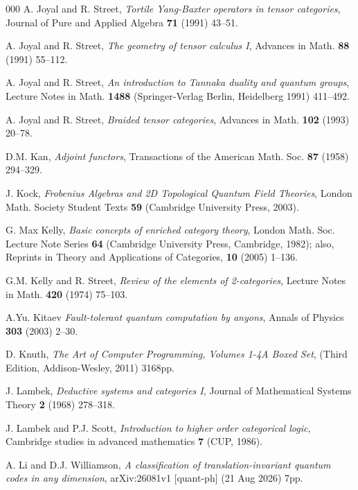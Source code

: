 \documentclass[a4paper,12pt]{article}
\theoremstyle{step}
\begin{document}
\begin{thebibliography}{000}
 A. Joyal and R. Street, 
\textit{Tortile Yang-Baxter operators in tensor categories}, 
Journal of Pure and Applied Algebra \textbf{71} (1991) 43--51. 

 A. Joyal and R. Street, 
\textit{The geometry of tensor calculus I}, 
Advances in Math. \textbf{88} (1991) 55--112.

 A. Joyal and R. Street, 
\textit{An introduction to Tannaka duality and quantum groups}, Lecture Notes in Math. \textbf{1488} (Springer-Verlag Berlin, Heidelberg 1991) 411--492.

  A. Joyal and R. Street, 
\textit{Braided tensor categories}, 
Advances in Math. \textbf{102} (1993) 20--78.

 D.M. Kan, \textit{Adjoint functors}, 
Transactions of the American Math. Soc. \textbf{87} (1958) 294--329. \label{Kan1958}

 J. Kock,
\textit{Frobenius Algebras and 2D Topological Quantum Field Theories},
London Math. Society Student Texts \textbf{59} (Cambridge University Press, 2003).

 G. Max Kelly, 
\textit{Basic concepts of enriched category theory}, 
London Math. Soc. Lecture Note Series \textbf{64} (Cambridge University Press, Cambridge, 1982); also, Reprints in Theory and Applications of Categories, \textbf{10} (2005) 1--136. 

 G.M. Kelly and R. Street, 
\textit{Review of the elements of 2-categories}, 
Lecture Notes in Math. \textbf{420} (1974) 75--103.

 A.Yu. Kitaev
\textit{Fault-tolerant quantum computation by anyons},
Annals of Physics \textbf{303} (2003) 2--30.

 D. Knuth,
\textit{The Art of Computer Programming, Volumes 1-4A Boxed Set}, 
(Third Edition, Addison-Wesley, 2011) 3168pp.

 J. Lambek, 
\textit{Deductive systems and categories I}, 
Journal of Mathematical Systems Theory \textbf{2} (1968) 278--318.
\label{Lam}

 J. Lambek and P.J. Scott, 
\textit{Introduction to higher order categorical logic}, 
Cambridge studies in advanced mathematics \textbf{7} (CUP, 1986).
\label{LamSco}

 A. Li and D.J. Williamson,
\textit{A classification of translation-invariant quantum codes in any dimension},
arXiv:26081v1 [quant-ph] (21 Aug 2026) 7pp.


\end{thebibliography}
\end{document}
